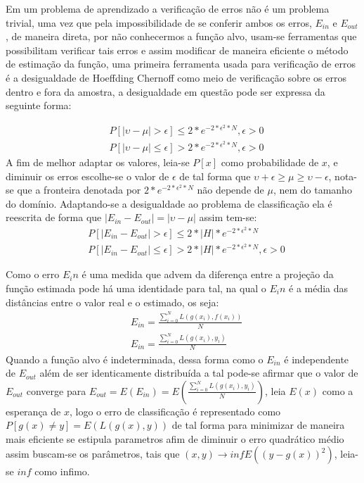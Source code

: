 \documentclass[pfc]{imetex}
\begin{document}
    Em um problema de aprendizado a verificação de erros não é um problema trivial, uma vez que pela impossibilidade de se conferir ambos os erros, $E_{in}$ e $E_{out}$, de maneira direta, por não conhecermos a função alvo, usam-se ferramentas que possibilitam verificar tais erros e assim modificar de maneira eficiente o método de estimação da função, uma primeira ferramenta usada para verificação de erros é a desigualdade de Hoeffding Chernoff como meio de verificação sobre os erros dentro e fora da amostra, a desigualdade em questão pode ser expressa da seguinte forma:

    \begin{equation}
        \begin{split}
            & P[|\upsilon - \mu|>\epsilon] \leq 2*e^{-2*\epsilon^2*N}, \epsilon>0 \\
            & P[|\upsilon - \mu|\leq\epsilon] > 2*e^{-2*\epsilon^2*N}, \epsilon>0
    \end{split}
    \end{equation}
    \newline
    A fim de melhor adaptar os valores, leia-se $P[x]$ como probabilidade de $x$, e diminuir os erros escolhe-se o valor de $\epsilon$ de tal forma que $\upsilon + \epsilon \geq \mu \geq \upsilon - \epsilon$, nota-se que a fronteira denotada por $2*e^{-2*\epsilon^2*N}$ não depende de $\mu$, nem do tamanho do domínio.
    \newline
    Adaptando-se a desigualdade ao problema de classificação ela é reescrita de forma que $|E_{in}-E_{out}|=|\upsilon-\mu|$ assim tem-se:
    \begin{equation}
        \begin{split}
             & P[|E_{in}-E_{out}|>\epsilon] \leq 2*|H|*e^{-2*\epsilon^2*N} \\ & P[|E_{in}-E_{out}|\leq\epsilon] > 2*|H|*e^{-2*\epsilon^2*N}, \epsilon>0
        \end{split}
    \end{equation}

    Como o erro $E_in$ é uma medida que advem da diferença entre a projeção da função estimada pode há uma identidade para tal, na qual o $E_in$ é a média das distâncias entre o valor real e o estimado, os seja:
    \begin{equation}
        \begin{split}
            & E_{in} = \frac{\sum\limits_{i=0}^N L(g(x_i),f(x_i))}{N} \\
            & E_{in} = \frac{\sum\limits_{i=0}^N L(g(x_i),y_i)}{N}
        \end{split}
    \end{equation}
    Quando a função alvo é indeterminada, dessa forma como o $E_{in}$ é independente de $E_{out}$ além de ser identicamente distribuída a tal pode-se afirmar que o valor de $E_{out}$ converge para $E_{out} = E(E_{in}) = E(\frac{\sum\limits_{i=0}^N L(g(x_i),y_i)}{N})$, leia $E(x)$ como a esperança de $x$, logo o erro de classificação é representado como $P[g(x) \neq y] = E(L(g(x),y))$ de tal forma para minimizar de maneira mais eficiente se estipula parametros afim de diminuir o erro quadrático médio assim buscam-se os parâmetros, tais que $(x, y) \rightarrow inf E((y-g(x))^2)$, leia-se $inf$ como infimo.
\end{document}
